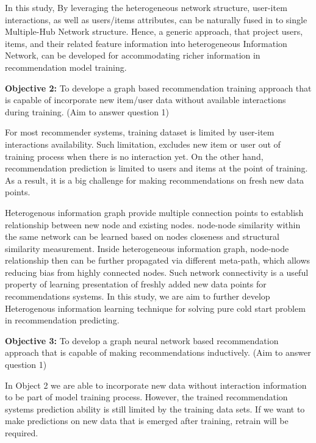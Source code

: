 In this study, By leveraging the heterogeneous network structure, user-item interactions, as well as users/items attributes, can be naturally fused in to single Multiple-Hub Network \citep{Shi2017} structure. Hence, a generic approach, that project users, items, and their related feature information into heterogeneous Information Network, can be developed for accommodating richer information in recommendation model training.


\bigskip
\textbf{Objective 2:} To develope a graph based recommendation training approach that is capable of incorporate new item/user data without available interactions during training. (Aim to answer question 1)

For most recommender systems, training dataset is limited by user-item interactions availability. Such limitation, excludes new item or user out of training process when there is no interaction yet. On the other hand, recommendation prediction is limited to users and items at the point of training. As a result, it is a big challenge for making recommendations on fresh new data points. 

Heterogenous information graph provide multiple connection points to establish relationship between new node and existing nodes. node-node similarity within the same network can be learned based on nodes closeness and structural similarity measurement. Inside heterogeneous information graph, node-node relationship then can be further propagated via different meta-path, which allows reducing bias from highly connected nodes. Such network connectivity is a useful property of learning presentation of freshly added new data points for recommendations systems. In this study, we are aim to further develop Heterogenous information learning technique for solving pure cold start problem in recommendation predicting.

\bigskip
\textbf{Objective 3:} To develop a graph neural network based recommendation approach that is capable of making recommendations inductively. (Aim to answer question 1)

In Object 2 we are able to incorporate new data without interaction information to be part of model training process. However, the trained recommendation systems prediction ability is still limited by the training data sets. If we want to make predictions on new data that is emerged after training, retrain will be required. 

